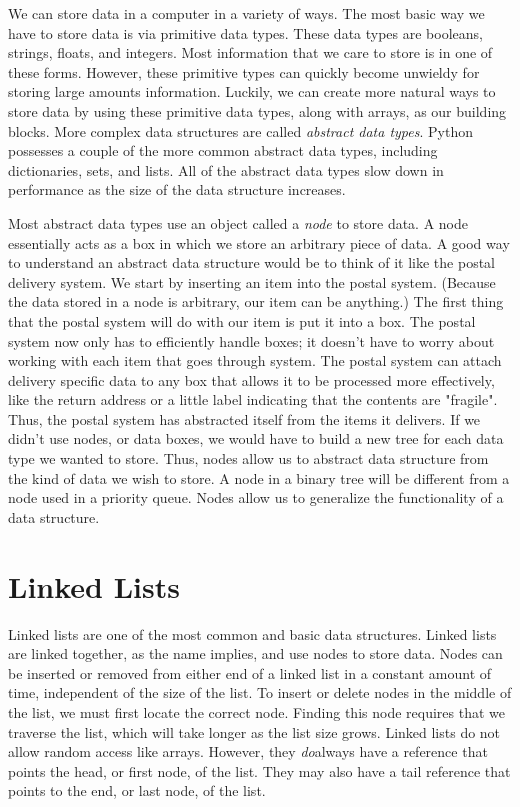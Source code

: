 \label{lab:Python_DataStructures}

We can store data in a computer in a variety of ways.
The most basic way we have to store data is via primitive data types.
These data types are booleans, strings, floats, and integers.
Most information that we care to store is in one of these forms.
However, these primitive types can quickly become unwieldy for storing large amounts information.
Luckily, we can create more natural ways to store data by using these primitive data types, along with arrays, as our building blocks.
More complex data structures are called \emph{abstract data types}.
Python possesses a couple of the more common abstract data types, including dictionaries, sets, and lists.
All of the abstract data types slow down in performance as the size of the data structure increases.

Most abstract data types use an object called a \emph{node} to store data.
A node essentially acts as a box in which we store an arbitrary piece of data.
A good way to understand an abstract data structure would be to think of it like the postal delivery system.
We start by inserting an item into the postal system.  (Because the data stored in a node is arbitrary, our item can be anything.)
The first thing that the postal system will do with our item is put it into a box.
The postal system now only has to efficiently handle boxes;
it doesn't have to worry about working with each item that goes through system.
The postal system can attach delivery specific data to any box that allows it to be processed more effectively, like the return address or a little label indicating that the contents are "fragile".
Thus, the postal system has abstracted itself from the items it delivers.
If we didn't use nodes, or data boxes, we would have to build a new tree for each data type we wanted to store.
Thus, nodes allow us to abstract data structure from the kind of data we wish to store.
A node in a binary tree will be different from a node used in a priority queue.
Nodes allow us to generalize the functionality of a data structure.

\section*{Linked Lists}
Linked lists are one of the most common and basic data structures.
Linked lists are linked together, as the name implies, and use nodes to store data.
Nodes can be inserted or removed from either end of a linked list in a constant amount of time, independent of the size of the list.
To insert or delete nodes in the middle of the list, we must first locate the correct node.
Finding this node requires that we traverse the list, which will take longer as the list size grows.
Linked lists do not allow random access like arrays.
However, they \emph{do}always have a reference that points the head, or first node, of the list.
They may also have a tail reference that points to the end, or last node, of the list.

